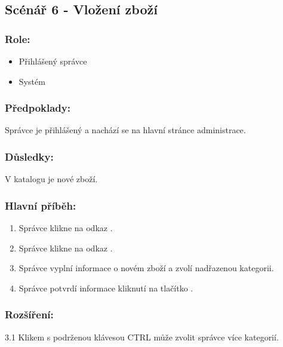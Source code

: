 \documentclass[11pt,twoside,a4paper]{book}
\begin{document}
\subsection{Scénář 6 - Vložení zboží}

\subsubsection*{Role:}

\begin{itemize}
\item Přihlášený správce
\item Systém
\end{itemize}

\subsubsection*{Předpoklady:}

Správce je přihlášený a nachází se na hlavní stránce administrace.

\subsubsection*{Důsledky:}

V katalogu je nové zboží.

\subsubsection*{Hlavní příběh:}

\begin{enumerate}
\item Správce klikne na odkaz .
\item Správce klikne na odkaz .
\item Správce vyplní informace o novém zboží a zvolí nadřazenou kategorii.
\item Správce potvrdí informace kliknutí na tlačítko .
\end{enumerate}

\subsubsection*{Rozšíření:}

\begin{description}
\item  3.1 Klikem s podrženou klávesou CTRL může zvolit správce více kategorií.
\end{description}
\end{document}
